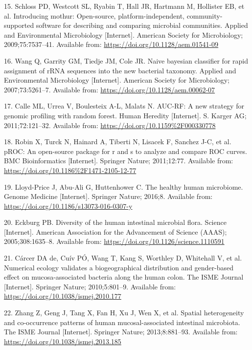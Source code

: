 \documentclass[12pt,]{article}
\begin{document}
\hypertarget{ref-Schloss2009}{}
15. Schloss PD, Westcott SL, Ryabin T, Hall JR, Hartmann M, Hollister
EB, et al. Introducing mothur: Open-source, platform-independent,
community-supported software for describing and comparing microbial
communities. Applied and Environmental Microbiology {[}Internet{]}.
American Society for Microbiology; 2009;75:7537--41. Available from:
\url{https://doi.org/10.1128/aem.01541-09}

\hypertarget{ref-Wang2007}{}
16. Wang Q, Garrity GM, Tiedje JM, Cole JR. Naive bayesian classifier
for rapid assignment of rRNA sequences into the new bacterial taxonomy.
Applied and Environmental Microbiology {[}Internet{]}. American Society
for Microbiology; 2007;73:5261--7. Available from:
\url{https://doi.org/10.1128/aem.00062-07}

\hypertarget{ref-Calle_2011}{}
17. Calle ML, Urrea V, Boulesteix A-L, Malats N. AUC-RF: A new strategy
for genomic profiling with random forest. Human Heredity {[}Internet{]}.
S. Karger AG; 2011;72:121--32. Available from:
\url{https://doi.org/10.1159\%2F000330778}

\hypertarget{ref-Robin_2011}{}
18. Robin X, Turck N, Hainard A, Tiberti N, Lisacek F, Sanchez J-C, et
al. pROC: An open-source package for r and s to analyze and compare ROC
curves. BMC Bioinformatics {[}Internet{]}. Springer Nature; 2011;12:77.
Available from: \url{https://doi.org/10.1186\%2F1471-2105-12-77}

\hypertarget{ref-LloydPrice2016}{}
19. Lloyd-Price J, Abu-Ali G, Huttenhower C. The healthy human
microbiome. Genome Medicine {[}Internet{]}. Springer Nature; 2016;8.
Available from: \url{https://doi.org/10.1186/s13073-016-0307-y}

\hypertarget{ref-Eckburg2005}{}
20. Eckburg PB. Diversity of the human intestinal microbial flora.
Science {[}Internet{]}. American Association for the Advancement of
Science (AAAS); 2005;308:1635--8. Available from:
\url{https://doi.org/10.1126/science.1110591}

\hypertarget{ref-deCarcer2010}{}
21. Cárcer DA de, Cuív PÓ, Wang T, Kang S, Worthley D, Whitehall V, et
al. Numerical ecology validates a biogeographical distribution and
gender-based effect on mucosa-associated bacteria along the human colon.
The ISME Journal {[}Internet{]}. Springer Nature; 2010;5:801--9.
Available from: \url{https://doi.org/10.1038/ismej.2010.177}

\hypertarget{ref-Zhang2013}{}
22. Zhang Z, Geng J, Tang X, Fan H, Xu J, Wen X, et al. Spatial
heterogeneity and co-occurrence patterns of human mucosal-associated
intestinal microbiota. The ISME Journal {[}Internet{]}. Springer Nature;
2013;8:881--93. Available from:
\url{https://doi.org/10.1038/ismej.2013.185}
\end{document}
